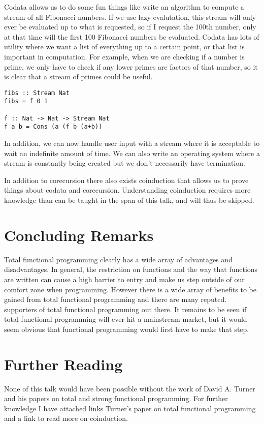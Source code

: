 \documentclass[12pt]{article}
\begin{document}
Codata allows us to do some fun things like write an algorithm to compute a stream of all Fibonacci numbers. If we use lazy evalutation, this stream will only ever be evaluated up to what is requested, so if I request the 100th number, only at that time will the first 100 Fibonacci numbers be evaluated. Codata has lots of utility where we want a list of everything up to a certain point, or that list is important in computation. For example, when we are checking if a number is prime, we only have to check if any lower primes are factors of that number, so it is clear that a stream of primes could be useful.
\bigskip
\begin{lstlisting}[frame=single,mathescape=true]
fibs :: Stream Nat
fibs = f 0 1

f :: Nat -> Nat -> Stream Nat
f a b = Cons (a (f b (a+b))
\end{lstlisting}
In addition, we can now handle user input with a stream where it is acceptable to wait an indefinite amount of time. We can also write an operating system where a stream is constantly being created but we don't necessarily have termination.

In addition to corecursion there also exists coinduction that allows us to prove things about codata and corecursion. Understanding coinduction requires more knowledge than can be taught in the span of this talk, and will thus be skipped.

\section{Concluding Remarks}
Total functional programming clearly has a wide array of advantages and disadvantages. In general, the restriction on functions and the way that functions are written can cause a high barrier to entry and make us step outside of our comfort zone when programming. However there is a wide array of benefits to be gained from total functional programming and there are many reputed. supporters of total functional programming out there. It remains to be seen if total functional programming will ever hit a mainstream market, but it would seem obvious that functional programming would first have to make that step.


\section{Further Reading}

None of this talk would have been possible without the work of David A. Turner and his papers on total and strong functional programming. For further knowledge I have attached links Turner's paper on total functional programming and a link to read more on coinduction.
\end{document}

